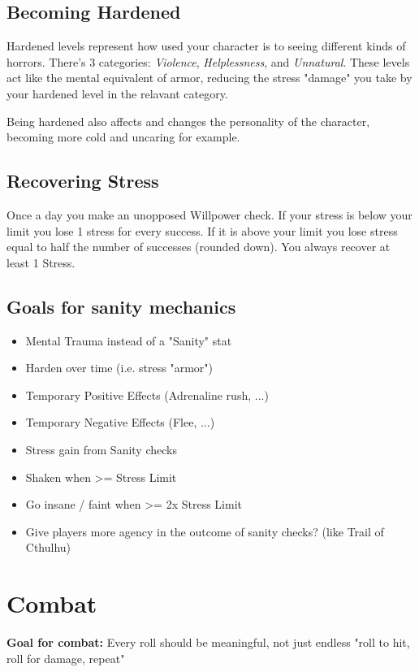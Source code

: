 \section{Becoming Hardened}
Hardened levels represent how used your character is to seeing different kinds of horrors.
There's 3 categories: \textit{Violence}, \textit{Helplessness}, and \textit{Unnatural}.
These levels act like the mental equivalent of armor, reducing the stress "damage" 
you take by your hardened level in the relavant category.

Being hardened also affects and changes the personality of the character, becoming more cold and uncaring for example.


\section{Recovering Stress}
Once a day you make an unopposed Willpower check. 
If your stress is below your limit you lose 1 stress for every success. 
If it is above your limit you lose stress equal to half the number of successes (rounded down).
You always recover at least 1 Stress.

\section{Goals for sanity mechanics}
\begin{itemize}
    \item Mental Trauma instead of a "Sanity" stat
    \item Harden over time (i.e. stress "armor")
    \item Temporary Positive Effects (Adrenaline rush, ...)
    \item Temporary Negative Effects (Flee, ...)
    \item Stress gain from Sanity checks
    \item Shaken when >= Stress Limit
    \item Go insane / faint when >= 2x Stress Limit
    \item Give players more agency in the outcome of sanity checks? (like Trail of Cthulhu)
\end{itemize}


\chapter{Combat}

\textbf{Goal for combat:} Every roll should be meaningful, not just endless "roll to hit, roll for damage, repeat" 

